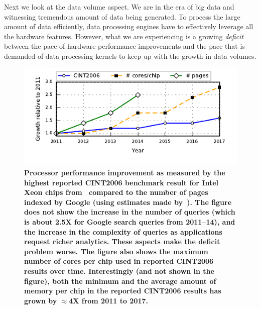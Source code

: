 Next we look at the data volume aspect.
We are in the era of big data and witnessing tremendous amount of data being generated.
To process the large amount of data efficiently, data processing engines have to effectively leverage all the hardware features. 
However, what we are experiencing is a growing \textit{deficit} between the pace of hardware performance improvements and the pace that is demanded of data processing kernels to keep up with the growth in data volumes.

\begin{figure}
	\centering
	\includegraphics[width=\columnwidth]{system/figures/deficit.pdf}
	\caption{\textbf{Processor performance improvement as measured by the highest reported CINT2006 benchmark result for Intel Xeon chips from~\cite{cpu2006} compared to the number of pages indexed by Google (using estimates made by~\cite{google-pages-db}). The figure does not show the increase in the number of queries (which is about 2.5X for Google search queries from 2011--14), and the increase in the complexity of queries as applications request richer analytics. These aspects make the deficit problem worse. The figure also shows the maximum number of cores per chip used in reported CINT2006 results over time. Interestingly (and not shown in the figure), both the minimum and the average amount of memory per chip in the reported CINT2006 results has grown by $\approx$4X from 2011 to 2017.}}
	\label{fig-deficit}
\end{figure}

